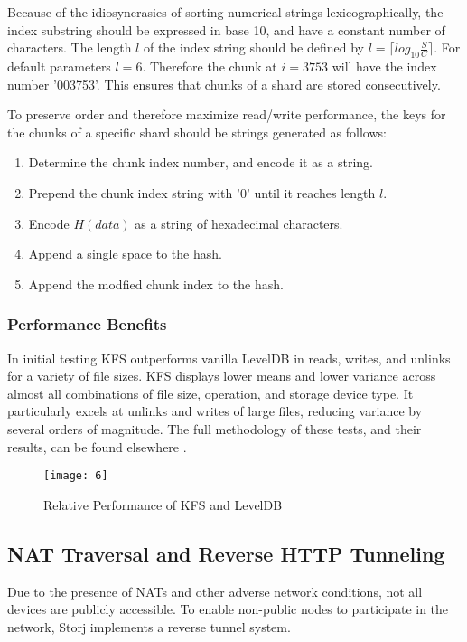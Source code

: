 \documentclass[a4paper,10pt]{article}
\begin{document}
Because of the idiosyncrasies of sorting numerical strings lexicographically,
the index substring should be expressed in base 10, and have a constant number
of characters. The length $ l $ of the index string should be defined by $ l =
\lceil log_{10} \frac{S}{C} \rceil $. For default parameters $ l = 6 $.
Therefore the chunk at $ i = 3753 $ will have the index number '003753'. This
ensures that chunks of a shard are stored consecutively.

To preserve order and therefore maximize read/write performance, the keys for
the chunks of a specific shard should be strings generated as follows:

\begin{enumerate}
\item Determine the chunk index number, and encode it as a string.
\item Prepend the chunk index string with '0' until it reaches length $ l $.
\item Encode $ H(data) $ as a string of hexadecimal characters.
\item Append a single space to the hash.
\item Append the modfied chunk index to the hash.
\end{enumerate}

\subsubsection{Performance Benefits}
In initial testing KFS outperforms vanilla LevelDB in reads, writes, and unlinks
for a variety of file sizes. KFS displays lower means and lower variance across
almost all combinations of file size, operation, and storage device type. It
particularly excels at unlinks and writes of large files, reducing variance by
several orders of magnitude. The full methodology of these tests, and their
results, can be found elsewhere \cite{13}.

\begin{figure}[hbt]
\centering
\texttt{[image: 6]}
\caption{Relative Performance of KFS and LevelDB}
\end{figure}

\subsection{NAT Traversal and Reverse HTTP Tunneling}
Due to the presence of NATs and other adverse network conditions, not all
devices are publicly accessible. To enable non-public nodes to participate in
the network, Storj implements a reverse tunnel system.
\end{document}
